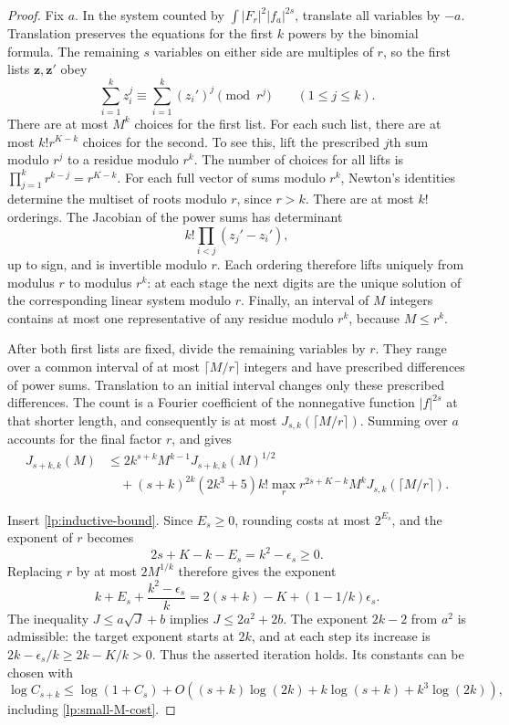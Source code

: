 \begin{proof}
Fix $a$.  In the system counted by
$\int|F_r|^2|f_a|^{2s}$, translate all variables by $-a$.
Translation preserves the equations for the first $k$ powers by the
binomial formula.  The remaining $s$ variables on either side are
multiples of $r$, so the first lists $\boldsymbol z,\boldsymbol z'$ obey
\begin{equation}\label{lp:power-congruences}
 \sum_{i=1}^kz_i^j\equiv\sum_{i=1}^k(z_i')^j\pmod{r^j}
 \qquad(1\le j\le k).
\end{equation}
There are at most $M^k$ choices for the first list.  For each such list,
there are at most $k!r^{K-k}$ choices for the second.  To see this,
lift the prescribed $j$th sum modulo $r^j$ to a residue modulo $r^k$.
The number of choices for all lifts is
$\prod_{j=1}^k r^{k-j}=r^{K-k}$.
For each full vector of sums modulo $r^k$, Newton's identities determine
the multiset of roots modulo $r$, since $r>k$.  There are at most $k!$
orderings.  The Jacobian of the power sums has determinant
\[
 k!\prod_{i<j}(z_j'-z_i'),
\]
up to sign, and is invertible modulo $r$.  Each ordering therefore lifts
uniquely from modulus $r$ to modulus $r^k$: at each stage the next digits
are the unique solution of the corresponding linear system modulo $r$.
Finally, an interval of $M$ integers contains at most one representative
of any residue modulo $r^k$, because $M\le r^k$.

After both first lists are fixed, divide the remaining variables by $r$.
They range over a common interval of at most $\lceil M/r\rceil$ integers
and have prescribed differences of power sums.  Translation to an
initial interval changes only these prescribed differences.  The count
is a Fourier coefficient of the nonnegative function $|f|^{2s}$ at that
shorter length, and consequently is at most
$J_{s,k}(\lceil M/r\rceil)$.  Summing over $a$ accounts for the final
factor $r$, and gives
\begin{equation}\label{lp:recurrence-count}
 \begin{split}
 J_{s+k,k}(M)
 &\le 2k^{s+k}M^{k-1}J_{s+k,k}(M)^{1/2}\\
 &\quad +(s+k)^{2k}(2k^3+5)k!
       \max_r r^{2s+K-k}M^kJ_{s,k}(\lceil M/r\rceil).
 \end{split}
\end{equation}

Insert \eqref{lp:inductive-bound}.  Since $E_s\ge0$, rounding costs
at most $2^{E_s}$, and the exponent of $r$ becomes
\[
 2s+K-k-E_s=k^2-\epsilon_s\ge0.
\]
Replacing $r$ by at most $2M^{1/k}$ therefore gives the exponent
\[
 k+E_s+\frac{k^2-\epsilon_s}{k}
 =2(s+k)-K+(1-1/k)\epsilon_s.
\]
The inequality $J\le a\sqrt J+b$ implies $J\le2a^2+2b$.
The exponent $2k-2$ from $a^2$ is admissible: the target exponent
starts at $2k$, and at each step its increase is
$2k-\epsilon_s/k\ge2k-K/k>0$.
Thus the asserted iteration holds.  Its constants can be chosen with
\[
 \log C_{s+k}\le \log(1+C_s)
 +O\!\left((s+k)\log(2k)+k\log(s+k)+k^3\log(2k)\right),
\]
including \eqref{lp:small-M-cost}.


\end{proof}
